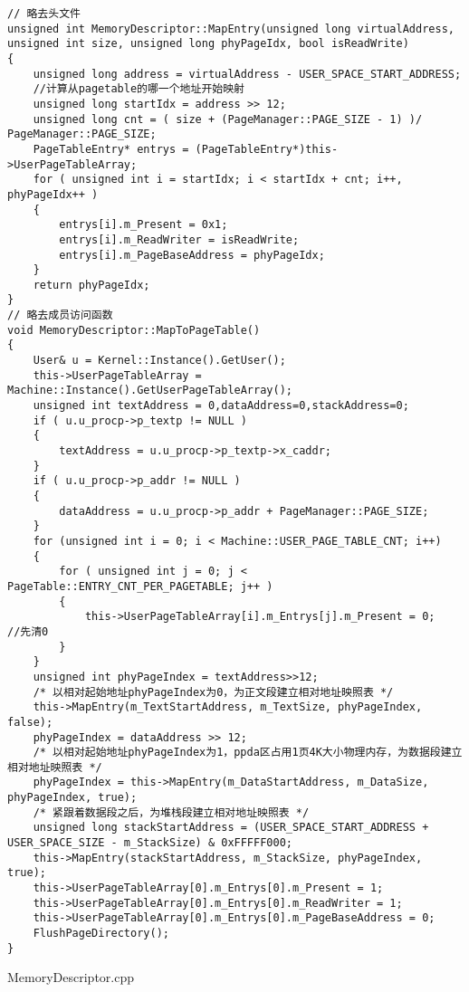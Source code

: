 \begin{listing}[!h]
    \begin{verbatim}
// 略去头文件
unsigned int MemoryDescriptor::MapEntry(unsigned long virtualAddress, unsigned int size, unsigned long phyPageIdx, bool isReadWrite)
{    
    unsigned long address = virtualAddress - USER_SPACE_START_ADDRESS;
    //计算从pagetable的哪一个地址开始映射
    unsigned long startIdx = address >> 12;
    unsigned long cnt = ( size + (PageManager::PAGE_SIZE - 1) )/ PageManager::PAGE_SIZE;
    PageTableEntry* entrys = (PageTableEntry*)this->UserPageTableArray;
    for ( unsigned int i = startIdx; i < startIdx + cnt; i++, phyPageIdx++ )
    {
        entrys[i].m_Present = 0x1;
        entrys[i].m_ReadWriter = isReadWrite;
        entrys[i].m_PageBaseAddress = phyPageIdx;
    }
    return phyPageIdx;
}
// 略去成员访问函数
void MemoryDescriptor::MapToPageTable()
{
    User& u = Kernel::Instance().GetUser();
    this->UserPageTableArray = Machine::Instance().GetUserPageTableArray();
    unsigned int textAddress = 0,dataAddress=0,stackAddress=0;
    if ( u.u_procp->p_textp != NULL )
    {
        textAddress = u.u_procp->p_textp->x_caddr;
    }
    if ( u.u_procp->p_addr != NULL )
    {
        dataAddress = u.u_procp->p_addr + PageManager::PAGE_SIZE;
    }
    for (unsigned int i = 0; i < Machine::USER_PAGE_TABLE_CNT; i++)
    {
        for ( unsigned int j = 0; j < PageTable::ENTRY_CNT_PER_PAGETABLE; j++ )
        {
            this->UserPageTableArray[i].m_Entrys[j].m_Present = 0;   //先清0
        }
    }
    unsigned int phyPageIndex = textAddress>>12;
    /* 以相对起始地址phyPageIndex为0，为正文段建立相对地址映照表 */
    this->MapEntry(m_TextStartAddress, m_TextSize, phyPageIndex, false);
    phyPageIndex = dataAddress >> 12;
    /* 以相对起始地址phyPageIndex为1，ppda区占用1页4K大小物理内存，为数据段建立相对地址映照表 */
    phyPageIndex = this->MapEntry(m_DataStartAddress, m_DataSize, phyPageIndex, true);
    /* 紧跟着数据段之后，为堆栈段建立相对地址映照表 */
    unsigned long stackStartAddress = (USER_SPACE_START_ADDRESS + USER_SPACE_SIZE - m_StackSize) & 0xFFFFF000;
    this->MapEntry(stackStartAddress, m_StackSize, phyPageIndex, true);
    this->UserPageTableArray[0].m_Entrys[0].m_Present = 1;
    this->UserPageTableArray[0].m_Entrys[0].m_ReadWriter = 1;
    this->UserPageTableArray[0].m_Entrys[0].m_PageBaseAddress = 0;
    FlushPageDirectory();
}
    \end{verbatim}
    \caption{MemoryDescriptor.cpp}\label{lst:cpp}
\end{listing}